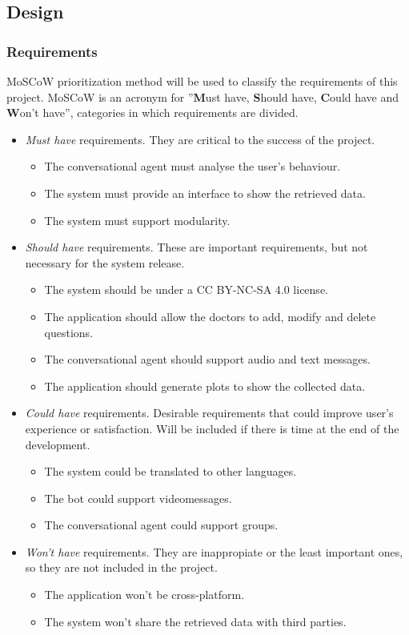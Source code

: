 \documentclass[12pt,english]{article}
\begin{document}
\subsection{Design}

\subsubsection{Requirements}
MoSCoW prioritization method \cite{moscow} will be used to classify the requirements of this project. MoSCoW is an acronym for ''\textbf{M}ust have, \textbf{S}hould have, \textbf{C}ould have and \textbf{W}on't have'', categories in which requirements are divided.
\begin{itemize}
  \item \emph{Must have} requirements. They are critical to the success of the project.
    \begin{itemize}
      \item The conversational agent must analyse the user's behaviour.
      \item The system must provide an interface to show the retrieved data.
      \item The system must support modularity.
    \end{itemize}
  \item \emph{Should have} requirements. These are important requirements, but not necessary for  the system release.
    \begin{itemize}
      \item The system should be under a CC BY-NC-SA 4.0 \cite{CC} license.
      \item The application should allow the doctors to add, modify and delete questions.
      \item The conversational agent should support audio and text messages.
      \item The application should generate plots to show the collected data.
    \end{itemize}
  \item \emph{Could have} requirements. Desirable requirements that could improve user's experience or satisfaction. Will be included if there is time at the end of the development.
    \begin{itemize}
      \item The system could be translated to other languages.
      \item The bot could support videomessages.
      \item The conversational agent could support groups.
    \end{itemize}
  \item \emph{Won't have} requirements. They are inappropiate or the least important ones, so they are not included in the project.
    \begin{itemize}
      \item The application won't be cross-platform.
      \item The system won't share the retrieved data with third parties.
    \end{itemize}
\end{itemize}
\newpage
\end{document}
